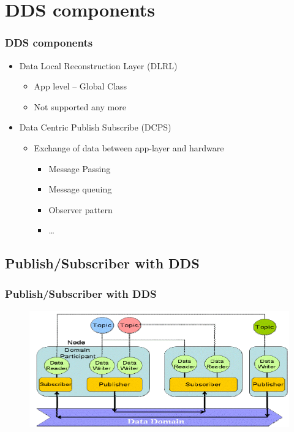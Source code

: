 \documentclass{beamer}
\begin{document}
	
	
\section{DDS components}
	\begin{frame}
		\frametitle{DDS components}
		
	
		\begin{itemize}
		\item Data Local Reconstruction Layer (DLRL)
		
			\begin{itemize}
			\item App level -- Global Class
			\item Not supported any more
			\end{itemize}
		
		\item Data Centric Publish Subscribe (DCPS)
		
			\begin{itemize}
			\item Exchange of data between app-layer and hardware

				\begin{itemize}
				\item Message Passing
				\item Message queuing
				\item Observer pattern
				\item \dots
				\end{itemize}	

			\end{itemize}
		
		\end{itemize}
		
	\end{frame}
	
	
	
\subsection{Publish/Subscriber with DDS}
	\begin{frame}
		\frametitle{Publish/Subscriber with DDS}

		\begin{figure}[hbtp]
		\centering
		\includegraphics[width=\linewidth]{DDSentities}
		\end{figure}
	\end{frame}
\end{document}
